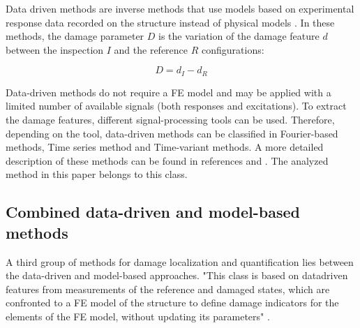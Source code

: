 \documentclass[journal]{IEEEtran}
\begin{document}
Data driven methods are inverse methods that use models based on experimental response data recorded on the structure instead of physical models
\cite{limongelli2016towards}.
 In these methods, the damage parameter $D$ is the variation of the damage feature $d$ between the inspection $I$ and the reference $R$ configurations: %


\begin{equation}
D=d_{I} - d_{R}
\end{equation}

Data-driven methods do not require a FE model  and may be applied with a limited number of available signals (both responses and excitations).
To extract the damage features, different signal-processing tools can be used. Therefore, depending on the tool,  data-driven methods can be classified in Fourier-based methods, Time series method and Time-variant methods.
A more detailed description of these methods can be found in references %
\cite{fassois2007time} and
\cite{staszewski2007time}.
The analyzed method in this paper belongs to this class.

\subsection{Combined data-driven and model-based methods}

A third group of methods for damage localization and quantification lies between the data-driven and model-based approaches.
 "This class is based on datadriven features from measurements of the reference and damaged states, which are confronted to a FE model of the structure to define damage indicators for the elements of the FE model,
 without updating its parameters" \cite{limongelli2016towards}. %
\end{document}
